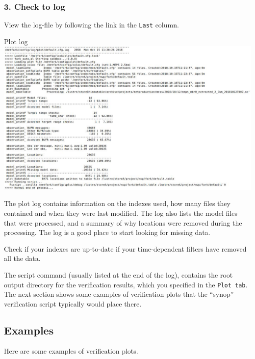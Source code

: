 \documentclass[letterpaper,10pt,twoside,twocolumn,openany]{book}
\begin{document}
{\subsubsection{3. Check to log}
View the log-file by following the link in the \lstinline!Last! column. 
\begin{paperbox}{Plot log}
  \includegraphics[width=\columnwidth]{plotlog.jpg}
\end{paperbox}
The plot log contains information on the indexes used, how many files they contained and when they were last modified.
The log also lists the model files that were processed, and a summary of why locations were removed during the processing. 
The log is a good place to start looking for missing data.
\begin{quotebox}
  Check if your indexes are up-to-date if your time-dependent filters have removed all the data.
\end{quotebox}

The script command (usually listed at the end of the log), contains the root output directory for the verification results, which you specified in the \lstinline!Plot tab!. The next section shows some examples of verification plots that the ``synop'' verification script typically would place there.

\subsection{Examples}
Here are some examples of verification plots.

}
\end{document}
